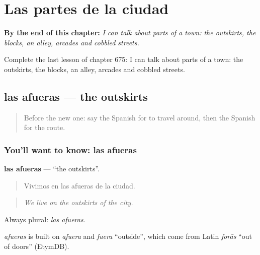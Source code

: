 
\chapter{Las partes de la ciudad}
\label{ch:es-las-partes-de-la-ciudad}

\begin{chapteropening}
\textbf{By the end of this chapter:} \emph{I can talk about parts of a town: the outskirts, the blocks, an alley, arcades and cobbled streets.}

Complete the last lesson of chapter 675: I can talk about parts of a town: the outskirts, the blocks, an alley, arcades and cobbled streets.
\end{chapteropening}

\section[las afueras]{las afueras — the outskirts}

\label{lesson:ES-C675-afueras}



\begin{quote}
Before the new one: say the Spanish for to travel around, then the Spanish for the route.
\end{quote}

\subsection*{You'll want to know: las afueras}
\textbf{las afueras} — \textquotedblleft{}the outskirts\textquotedblright{}.

\begin{quote}
Vivimos en las afueras de la ciudad.
\end{quote}

\begin{quote}
\emph{We live on the outskirts of the city.}
\end{quote}

Always plural: \emph{las afueras}.

\begin{cousinweb}
\emph{afueras} is built on \emph{afuera} and \emph{fuera} \textquotedblleft{}outside\textquotedblright{}, which come from Latin \emph{forās} \textquotedblleft{}out of doors\textquotedblright{} (EtymDB).
\end{cousinweb}

